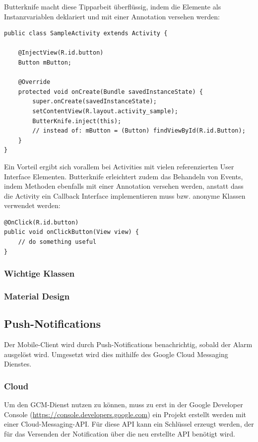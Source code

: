 Butterknife macht diese Tipparbeit überflüssig, indem die Elemente als Instanzvariablen deklariert und mit einer Annotation versehen werden:

\begin{lstlisting}[style=csharp, label=lst:butterknifeSample1, caption=Butterknife Beispiel 1]
public class SampleActivity extends Activity {

	@InjectView(R.id.button)
	Button mButton;
	
	@Override
	protected void onCreate(Bundle savedInstanceState) {
		super.onCreate(savedInstanceState);
		setContentView(R.layout.activity_sample);
		ButterKnife.inject(this);
		// instead of: mButton = (Button) findViewById(R.id.Button);
	}
}
\end{lstlisting}

Ein Vorteil ergibt sich vorallem bei Activities mit vielen referenzierten User Interface Elementen. Butterknife erleichtert zudem das Behandeln von Events, indem Methoden ebenfalls mit einer Annotation versehen werden, anstatt dass die Activity ein Callback Interface implementieren muss bzw. anonyme Klassen verwendet werden:

\begin{lstlisting}[style=csharp, label=lst:butterknifeSample2, caption=Butterknife Beispiel 2]
@OnClick(R.id.button)
public void onClickButton(View view) {
	// do something useful
}
\end{lstlisting}



\subsubsection{Wichtige Klassen}

\subsubsection{Material Design}

\subsection{Push-Notifications}
\label{sec:notificationRealization}
Der Mobile-Client wird durch Push-Notifications benachrichtig, sobald der Alarm ausgelöst wird. Umgesetzt wird dies mithilfe des Google Cloud Messaging Dienstes.

\subsubsection{Cloud}
Um den GCM-Dienst nutzen zu können, muss zu erst in der Google Developer Console (\url{https://console.developers.google.com}) ein Projekt erstellt werden mit einer Cloud-Messaging-API. Für diese API kann ein Schlüssel erzeugt werden, der für das Versenden der Notification über die neu erstellte API benötigt wird.

